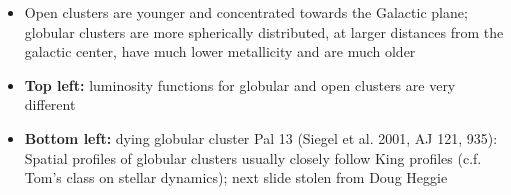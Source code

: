 \documentclass[letterpaper,landscape]{slides}
\begin{document}
\begin{slide}
{\begin{minipage}[t]{13cm}
\begin{itemize}
\item Open clusters are younger and concentrated towards the Galactic plane;
      globular clusters are more spherically distributed, at larger distances
      from the galactic center, have much lower metallicity and are much older
\item {\bf Top left:} luminosity functions for globular and open clusters 
       are very different 
\item {\bf Bottom left:} dying globular cluster Pal 13 (Siegel et al. 2001, 
      AJ 121, 935): Spatial profiles of globular clusters usually closely 
      follow King profiles (c.f. Tom's class on stellar dynamics);
      next slide stolen from Doug Heggie
\end{itemize}

\end{minipage}}
\vfill 
\end{slide}

\end{document}
